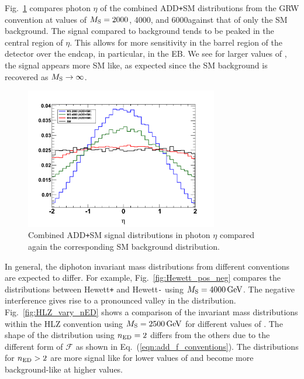 Fig.~\ref{fig:ADD_photon_eta} compares photon $\eta$ of the combined ADD\texttt{+}SM distributions from the GRW convention at values of $M_{\rm S} = 2000$, 4000, and 6000\GeV against that of only the SM background. The signal compared to background tends to be peaked in the central region of $\eta$. This allows for more sensitivity in the barrel region of the detector over the endcap, in particular, in the EB. We see for larger values of \Ms, the signal appears more SM like, as expected since the SM background is recovered as $M_{\rm S} \to \infty$.

\begin{figure}[!htbp]
  \centering
  \includegraphics[width=0.75\textwidth]{figures/add_signal_with_sm_photon_eta_edit.png}
  \caption{Combined ADD\texttt{+}SM signal distributions in photon $\eta$ compared again the corresponding SM background distribution.}
  \label{fig:ADD_photon_eta}
\end{figure}

In general, the diphoton invariant mass distributions from different conventions are expected to differ. For example, Fig.~\ref{fig:Hewett_pos_neg} compares the distributions between Hewett\texttt{+} and Hewett\texttt{-} using $M_{\rm S}=4000\,\text{Ge\hspace{-.08em}V}$. The negative interference gives rise to a pronounced valley in the distribution. Fig.~\ref{fig:HLZ_vary_nED} shows a comparison of the invariant mass distributions within the HLZ convention using $M_{\rm S}=2500\,\text{Ge\hspace{-.08em}V}$ for different values of \nED. The shape of the distribution using $n_{\rm ED}=2$ differs from the others due to the different form of $\mathcal{F}$ as shown in Eq.~(\ref{eqn:add_f_conventions}). The distributions for $n_{\rm ED}>2$ are more signal like for lower values of \nED and become more background-like at higher values.

